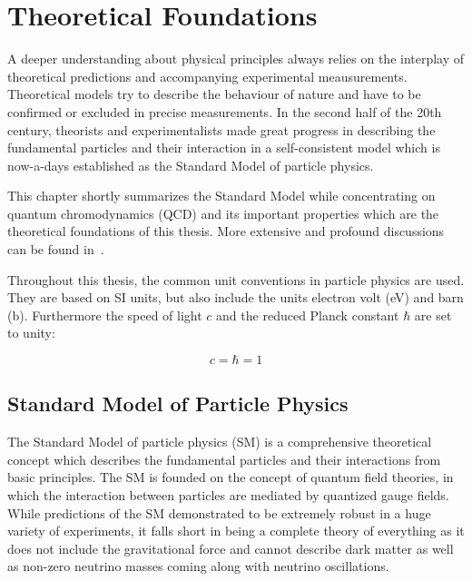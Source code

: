 
\chapter{Theoretical Foundations}
\label{sec:theoretical_foundations}

A deeper understanding about physical principles always relies on the interplay
of theoretical predictions and accompanying experimental meausurements.
Theoretical models try to describe the behaviour of nature and have to be
confirmed or excluded in precise measurements. In the second half of the 20th
century, theorists and experimentalists made great progress in describing the
fundamental particles and their interaction in a self-consistent model which is
now-a-days established as the Standard Model of particle physics.

This chapter shortly summarizes the Standard Model while concentrating on
quantum chromodynamics (QCD) and its important properties which are the
theoretical foundations of this thesis. More extensive and profound
discussions can be found in~\cite{Peskin:1995ev,Agashe:2014kda,Ellis:1991qj,Buckley:2011ms}.

Throughout this thesis, the common unit conventions in particle physics are
used.  They are based on SI units, but also include the units electron volt
(\si{\electronvolt}) and barn (\si{\barn}). Furthermore the speed of light $c$
and the reduced Planck constant $\hbar$ are set to unity:

\begin{equation*}
    c = \hbar = 1
\end{equation*}

\section{Standard Model of Particle Physics}

The Standard Model of particle physics (SM) is a comprehensive theoretical
concept which describes the fundamental particles and their interactions from
basic principles. The SM is founded on the concept of quantum field theories, in
which the interaction between particles are mediated by quantized gauge fields.
While predictions of the SM demonstrated to be extremely robust in a huge variety
of experiments, it falls short in being a complete theory of everything as it
does not include the gravitational force and cannot describe dark matter as well
as non-zero neutrino masses coming along with neutrino oscillations.


